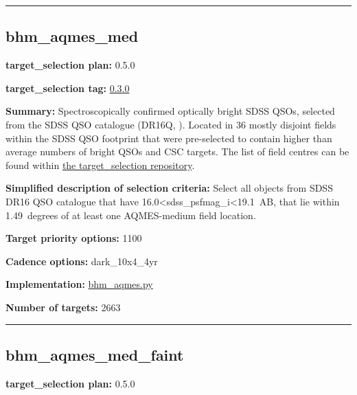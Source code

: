 \begin{center}\rule{0.5\linewidth}{0.5pt}\end{center}

\hypertarget{bhm_aqmes_med_plan0.5.0}{%
\subsection{bhm\_aqmes\_med}\label{bhm_aqmes_med_plan0.5.0}}

\noindent\textbf{target\_selection plan:} 0.5.0

\noindent\textbf{target\_selection tag:}
\href{https://github.com/sdss/target_selection/tree/0.3.0/}{0.3.0}

\noindent\textbf{Summary:} Spectroscopically confirmed optically bright SDSS
QSOs, selected from the SDSS QSO catalogue (DR16Q,
\citealt{Lyke2020}). Located in 36 mostly disjoint fields within the SDSS QSO
footprint that were pre-selected to contain higher than average numbers
of bright QSOs and CSC targets. The list of field centres can be found
within
\href{https://github.com/sdss/target_selection/blob/0.3.0/python/target_selection/masks/candidate_target_fields_bhm_aqmes_med_v0.3.1.fits}{the
target\_selection repository}.

\noindent\textbf{Simplified description of selection criteria:} Select all
objects from SDSS DR16 QSO catalogue that have
16.0\textless{}sdss\_psfmag\_i\textless{}19.1~AB, that lie within
1.49~degrees of at least one AQMES-medium field location.


\noindent\textbf{Target priority options:} 1100

\noindent\textbf{Cadence options:} dark\_10x4\_4yr

\noindent\textbf{Implementation:}
\href{https://github.com/sdss/target_selection/blob/0.3.0/python/target_selection/cartons/bhm_aqmes.py}{bhm\_aqmes.py}

\noindent\textbf{Number of targets:} 2663

\begin{center}\rule{0.5\linewidth}{0.5pt}\end{center}

\hypertarget{bhm_aqmes_med_faint_plan0.5.0}{%
\subsection{bhm\_aqmes\_med\_faint}\label{bhm_aqmes_med_faint_plan0.5.0}}

\noindent\textbf{target\_selection plan:} 0.5.0

